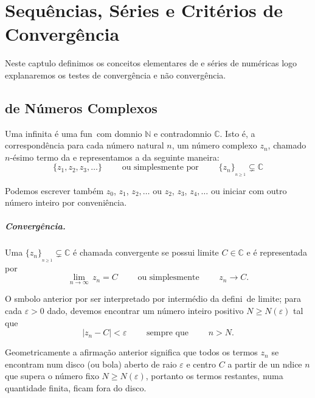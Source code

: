 %
\chapter{Sequ\^{e}ncias, S\'{e}ries e Crit\'{e}rios de Converg\^{e}ncia}
Neste cap\ii tulo definimos os conceitos elementares de  \seqs e s\'{e}ries de num\'{e}ricas logo explanaremos os testes de converg\^encia e n\~{a}o converg\^encia.

\section{\Seqs  de N\'{u}meros Complexos}
Uma \seq infinita \'e uma fun\cao\ com dom\ii nio  $\mathbb{N}$ e
contradom\ii nio  $\mathbb{C}$. Isto \'e, a correspond\^encia para
cada n\'umero natural $n$, um n\'{u}mero complexo $z_n$, chamado
$n$-\'{e}simo termo da \seq e representamos a \seq da seguinte maneira:
\begin{equation*}
  \{z_1,z_2,z_3,\ldots \} \qquad \text{ ou simplesmente por } \qquad
  \{z_n\}_{_{n\geq 1}}\subsetneq \mathbb{C}
\end{equation*}
\begin{obs}
Podemos escrever tamb\'em $z_0$, $z_1$, $z_2,\ldots$ ou
$z_2$, $z_3$, $z_4,\ldots$ ou iniciar com outro n\'{u}mero inteiro por
conveni\^{e}ncia.
\end{obs}

\paragraph{Converg\^{e}ncia.} 
Uma \seq  $\{z_n\}_{_{n\geq 1}}\subsetneq
\mathbb{C}$ \'e chamada convergente se possui limite $C\in \mathbb{C}$ e \'{e}
representada por
\begin{equation*}
  \lim_{n\to\infty}\,z_n=C\qquad \text{ ou simplesmente } \qquad z_n\to C.
\end{equation*}

O s\ii mbolo anterior por ser interpretado por interm\'edio da
defini\cao\ de limite; para cada $\varepsilon>0$ dado, devemos encontrar um n\'{u}mero inteiro positivo $N\geq N(\varepsilon)$ tal que
\begin{equation}\label{unouno}
  |z_n-C|<\varepsilon \qquad \text{ sempre que }\qquad n> N.
\end{equation}

Geometricamente a afirma\c{c}\~{a}o anterior significa que todos os termos
$z_n$ se encontram num disco (ou bola) aberto de raio
$\varepsilon$ e centro $C$ a partir de un \ii ndice $n$ que supera
o n\'umero fixo $N\geq N(\varepsilon)$, portanto os termos restantes,
numa quantidade finita, ficam fora do disco.

